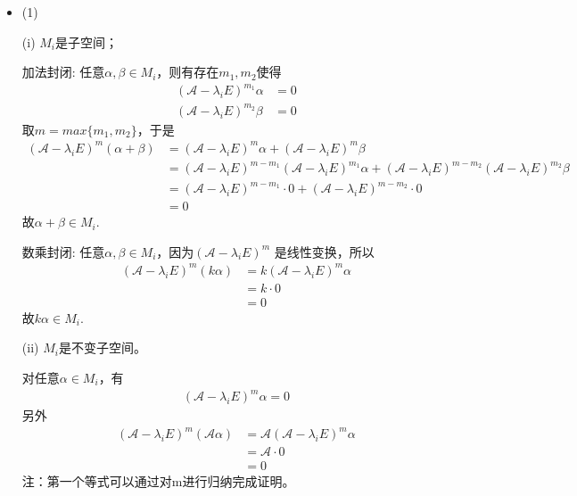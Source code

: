 \documentclass{article}
\begin{document}
\begin{itemize}
  \item (1)

        (i) $M_i$是子空间；

        加法封闭:
        任意$\alpha, \beta \in M_i$，则有存在$m_1, m_2$使得
        \begin{align*}
          (\mathscr{A} - \lambda_i E)^{m_1} \alpha & = 0 \\
          (\mathscr{A} - \lambda_i E)^{m_2} \beta  & = 0
        \end{align*}
        取$m = max\{m_1, m_2\}$，于是
        \begin{align*}
          (\mathscr{A} - \lambda_i E)^{m} (\alpha + \beta)
           & = (\mathscr{A} - \lambda_i E)^{m} \alpha + (\mathscr{A} - \lambda_i E)^{m} \beta                \\
           & = (\mathscr{A} - \lambda_i E)^{m - m_1} (\mathscr{A} - \lambda_i E)^{m_1} \alpha
          + (\mathscr{A} - \lambda_i E)^{m - m_2} (\mathscr{A} - \lambda_i E)^{m_2} \beta                    \\
           & = (\mathscr{A} - \lambda_i E)^{m - m_1} \cdot 0 + (\mathscr{A} - \lambda_i E)^{m - m_2} \cdot 0 \\
           & = 0
        \end{align*}
        故$\alpha + \beta \in M_i$.

        数乘封闭:
        任意$\alpha, \beta \in M_i$，因为$(\mathscr{A} - \lambda_i E)^{m}$
        是线性变换，所以
        \begin{align*}
          (\mathscr{A} - \lambda_i E)^{m} (k \alpha)
           & = k (\mathscr{A} - \lambda_i E)^{m} \alpha \\
           & = k \cdot 0                                \\
           & = 0
        \end{align*}
        故$k \alpha \in M_i$.

        (ii) $M_i$是不变子空间。

        对任意$\alpha \in M_i$，有
        \begin{align*}
          (\mathscr{A} - \lambda_i E)^{m} \alpha = 0
        \end{align*}
        另外
        \begin{align*}
          (\mathscr{A} - \lambda_i E)^m (\mathscr{A} \alpha)
           & = \mathscr{A} (\mathscr{A} - \lambda_i E)^m \alpha \\
           & = \mathscr{A} \cdot 0                              \\
           & = 0
        \end{align*}
        注：第一个等式可以通过对m进行归纳完成证明。


\end{itemize}
\end{document}
